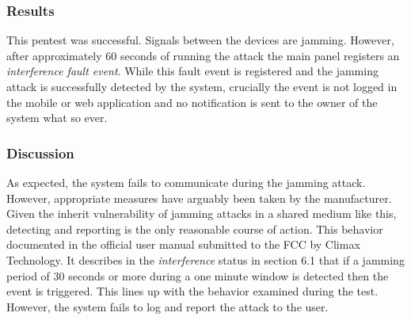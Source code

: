 \subsubsection{Results}
This pentest was successful. Signals between the devices are jamming. However, after approximately 60 seconds of running the attack the main panel registers an \textit{interference fault event}. While this fault event is registered and the jamming attack is successfully detected by the system, crucially the event is not logged in the mobile or web application and no notification is sent to the owner of the system what so ever.

\subsubsection{Discussion}
As expected, the system fails to communicate during the jamming attack. However, appropriate measures have arguably been taken by the manufacturer. Given the inherit vulnerability of jamming attacks in a shared medium like this, detecting and reporting is the only reasonable course of action. This behavior documented in the official user manual submitted to the FCC\cite{hsgw-user-manual} by Climax Technology. It describes in the \textit{interference} status in section 6.1 that if a jamming period of 30 seconds or more during a one minute window is detected then the event is triggered. This lines up with the behavior examined during the test. However, the system fails to log and report the attack to the user.